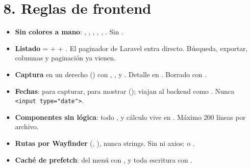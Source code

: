 \documentclass[11pt]{article}
\begin{document}
\section{8. Reglas de frontend}
\begin{itemize}[leftmargin=1.2em,itemsep=2pt]
  \item \textbf{Sin colores a mano}: , , , , , . Sin .
  \item \textbf{Listado} =  +  + . El paginador de Laravel entra directo. B\'usqueda, exportar, columnas y paginaci\'on ya vienen.
  \item \textbf{Captura} en un  derecho () con , ,  y . Detalle en . Borrado con .
  \item \textbf{Fechas}:  para capturar,  para mostrar (); viajan al backend como . Nunca \texttt{<input type="date">}.
  \item \textbf{Componentes sin l\'ogica}: todo ,  y c\'alculo vive en . M\'aximo 200 l\'ineas por archivo.
  \item \textbf{Rutas por Wayfinder} (, ), nunca strings. Sin  ni axios:  o .
  \item \textbf{Cach\'e de prefetch}:  del men\'u con , y toda escritura con .
\end{itemize}
\end{document}
